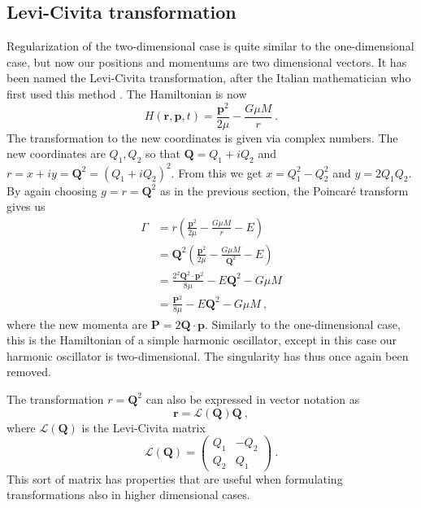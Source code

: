 \documentclass[english, oneside]{HYgradu}
\begin{document}
\subsection{Levi-Civita transformation} \label{sect:2dregu}

Regularization of the two-dimensional case is quite similar to the one-dimensional case, but now our positions and momentums are two dimensional vectors. It has been named the Levi-Civita transformation, after the Italian mathematician who first used this method \citep{levi-civita:1920}. The Hamiltonian is now
\begin{equation}
H(\mathbf{r},\mathbf{p},t) = \frac{\mathbf{p}^2}{2 \mu} - \frac{G \mu M}{r} \ .
\end{equation}
The transformation to the new coordinates is given via complex numbers. The new coordinates are $Q_1, Q_2$ so that $\mathbf{Q} = Q_1 + iQ_2$ and $r = x + iy = \mathbf{Q}^2 = (Q_1 + iQ_2)^2$. From this we get $x = Q_1^2 - Q_2^2$ and $y = 2Q_1 Q_2$. By again choosing $g = r = \mathbf{Q}^2$ as in the previous section, the Poincaré transform gives us 
\begin{align}
\Gamma &= r \left( \frac{\mathbf{p}^2}{2 \mu} - \frac{G \mu M}{r} - E \right) \nonumber \\ 
&= \mathbf{Q}^2 \left( \frac{\mathbf{p}^2}{2 \mu} - \frac{G \mu M}{\mathbf{Q}^2} - E \right) \nonumber \\
&= \frac{2^2 \mathbf{Q}^2 \cdot \mathbf{p}^2}{8 \mu} - E \mathbf{Q}^2 - G \mu M \nonumber \\
&= \frac{\mathbf{P}^2}{8 \mu} - E \mathbf{Q}^2 - G \mu M \ ,
\end{align}
where the new momenta are $\mathbf{P} = 2 \mathbf{Q} \cdot \mathbf{p}$. Similarly to the one-dimensional case, this is the Hamiltonian of a simple harmonic oscillator, except in this case our harmonic oscillator is two-dimensional. The singularity has thus once again been removed.

The transformation $r = \mathbf{Q}^2$ can also be expressed in vector notation as
\begin{equation}
\mathbf{r} = \mathcal{L}(\mathbf{Q}) \mathbf{Q} \ ,
\end{equation}
where $\mathcal{L}(\mathbf{Q})$ is the Levi-Civita matrix
\begin{equation}
\mathcal{L}(\mathbf{Q}) =
\begin{pmatrix}
Q_1 & -Q_2 \\
Q_2 & Q_1
\end{pmatrix} \ .
\end{equation}
This sort of matrix has properties that are useful when formulating transformations also in higher dimensional cases.
\end{document}
